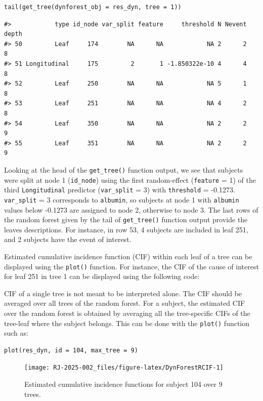 \begin{verbatim}
tail(get_tree(dynforest_obj = res_dyn, tree = 1))
\end{verbatim}

\begin{verbatim}
#>            type id_node var_split feature     threshold N Nevent depth
#> 50         Leaf     174        NA      NA            NA 2      2     8
#> 51 Longitudinal     175         2       1 -1.850322e-10 4      4     8
#> 52         Leaf     250        NA      NA            NA 5      1     8
#> 53         Leaf     251        NA      NA            NA 4      2     8
#> 54         Leaf     350        NA      NA            NA 2      2     9
#> 55         Leaf     351        NA      NA            NA 2      2     9
\end{verbatim}

\noindent Looking at the head of the \texttt{get\_tree()} function output, we see that subjects were split at node 1 (\texttt{id\_node}) using the first random-effect (\texttt{feature} = 1) of the third \texttt{Longitudinal} predictor (\texttt{var\_split} = 3) with \texttt{threshold} = -0.1273. \texttt{var\_split} = 3 corresponds to \texttt{albumin}, so subjects at node 1 with \texttt{albumin} values below -0.1273 are assigned to node 2, otherwise to node 3. The last rows of the random forest given by the tail of \texttt{get\_tree()} function output provide the leaves descriptions. For instance, in row 53, 4 subjects are included in leaf 251, and 2 subjects have the event of interest.

Estimated cumulative incidence function (CIF) within each leaf of a tree can be displayed using the \texttt{plot()} function. For instance, the CIF of the cause of interest for leaf 251 in tree 1 can be displayed using the following code:

CIF of a single tree is not meant to be interpreted alone. The CIF should be averaged over all trees of the random forest. For a subject, the estimated CIF over the random forest is obtained by averaging all the tree-specific CIFs of the tree-leaf where the subject belongs. This can be done with the \texttt{plot()} function such as:

\begin{verbatim}
plot(res_dyn, id = 104, max_tree = 9)
\end{verbatim}

\begin{figure}

{\centering \texttt{[image: RJ-2025-002\_files/figure-latex/DynForestRCIF-1]} 

}

\caption{Estimated cumulative incidence functions for subject 104 over 9 trees.}\label{fig:DynForestRCIF}
\end{figure}


